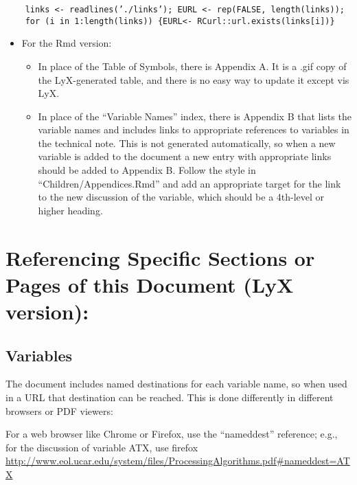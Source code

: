 \documentclass[
]{book}
\providecommand{\tightlist}{%
  \setlength{\itemsep}{0pt}\setlength{\parskip}{0pt}}
\begin{document}
\begin{verbatim}
    links <- readlines(’./links’); EURL <- rep(FALSE, length(links));
    for (i in 1:length(links)) {EURL<- RCurl::url.exists(links[i])}
\end{verbatim}

\begin{itemize}
\tightlist
\item
  For the Rmd version:

  \begin{itemize}
  \tightlist
  \item
    In place of the Table of Symbols, there is Appendix A. It is a .gif copy of the LyX-generated table, and there is no easy way to update it except vis LyX.
  \item
    In place of the ``Variable Names'' index, there is Appendix B that lists the variable names and includes links to appropriate references to variables in the technical note. This is not generated automatically, so when a new variable is added to the document a new entry with appropriate links should be added to Appendix B. Follow the style in ``Children/Appendices.Rmd'' and add an appropriate target for the link to the new discussion of the variable, which should be a 4th-level or higher heading.
  \end{itemize}
\end{itemize}

\hypertarget{referencing-specific-sections-or-pages-of-this-document-lyx-version}{%
\section*{Referencing Specific Sections or Pages of this Document (LyX version):}\label{referencing-specific-sections-or-pages-of-this-document-lyx-version}}

\hypertarget{variables}{%
\subsection*{Variables}\label{variables}}

The document includes named destinations for each variable name, so when used in a URL that destination can be reached. This is done differently in different browsers or PDF viewers:

For a web browser like Chrome or Firefox, use the ``nameddest'' reference; e.g., for the discussion of variable ATX, use
firefox \url{http://www.eol.ucar.edu/system/files/ProcessingAlgorithms.pdf\#nameddest=ATX}
\end{document}
